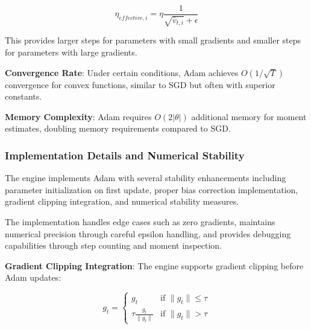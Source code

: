 \documentclass[11pt,a4paper]{report}
\begin{document}
\begin{equation}
\eta_{effective,i} = \eta \frac{1}{\sqrt{\hat{v}_{t,i}} + \epsilon}
\end{equation}

This provides larger steps for parameters with small gradients and smaller steps for parameters with large gradients.

\textbf{Convergence Rate}: Under certain conditions, Adam achieves $O(1/\sqrt{T})$ convergence for convex functions, similar to SGD but often with superior constants.

\textbf{Memory Complexity}: Adam requires $O(2|\theta|)$ additional memory for moment estimates, doubling memory requirements compared to SGD.

\subsubsection{Implementation Details and Numerical Stability}

The engine implements Adam with several stability enhancements including parameter initialization on first update, proper bias correction implementation, gradient clipping integration, and numerical stability measures.

The implementation handles edge cases such as zero gradients, maintains numerical precision through careful epsilon handling, and provides debugging capabilities through step counting and moment inspection.

\textbf{Gradient Clipping Integration}: The engine supports gradient clipping before Adam updates:

\begin{equation}
g_t = \begin{cases}
g_t & \text{if } \|g_t\| \leq \tau \\
\tau \frac{g_t}{\|g_t\|} & \text{if } \|g_t\| > \tau
\end{cases}
\end{equation}
\end{document}
